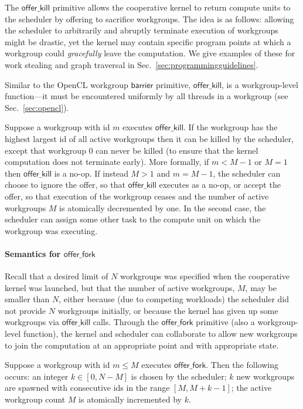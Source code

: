 \documentclass[numbers,nocopyrightspace,10pt]{sigplanconf}
\newcommand{\mysec}{Sec.~}
\newcommand{\offerfork}{\mathsf{offer\_fork}}
\newcommand{\offerkill}{\mathsf{offer\_kill}}
\begin{document}
The $\offerkill$ primitive allows the cooperative kernel to return
compute units to the scheduler by offering to sacrifice workgroups.
The idea is as follows: allowing the scheduler to arbitrarily and abruptly terminate execution
of workgroups might be drastic, yet the kernel
may contain specific program points at which a workgroup could
\emph{gracefully} leave the computation.  We give examples of these
for work stealing and graph traversal in \mysec\ref{sec:programmingguidelines}.

Similar to the OpenCL workgroup $\mathsf{barrier}$ primitive,
$\offerkill$, is a workgroup-level function---it must be encountered
uniformly by all threads in a workgroup (see
\mysec\ref{sec:opencl}).

Suppose a workgroup with id $m$ executes $\offerkill$.  
If the workgroup has the highest largest id of all active workgroups then it can be killed by the scheduler, except that workgroup 0 can never be killed (to ensure that the kernel computation does not terminate early).  More formally, if $m < M-1$
or $M=1$ then $\offerkill$ is a no-op.  If instead $M > 1$ and $m =
M-1$, the scheduler can choose to ignore the offer, so that $\offerkill$
executes as a no-op, or accept the offer, so that execution of the workgroup ceases and
the number of active workgroups $M$ is atomically decremented by one.  In the second case, the scheduler can assign some other task to
the compute unit on which the workgroup was executing.


\paragraph{Semantics for $\offerfork$}

Recall that
a desired limit of $N$ workgroups was specified when the cooperative kernel was launched, but that the number of active workgroups, $M$, may be smaller
than $N$, either because (due to competing workloads) the scheduler
did not provide $N$ workgroups initially, or because the kernel has
given up some workgroups via $\offerkill$ calls.  Through the
$\offerfork$ primitive (also a workgroup-level function), the kernel and scheduler can collaborate to allow new
workgroups to join the computation at an appropriate point and with
appropriate state.

Suppose a workgroup with id $m\leq M$ executes $\offerfork$.  Then the following occurs: an
integer $k \in [0, N-M]$ is chosen by the scheduler;
$k$ new workgroups are spawned with consecutive ids in the range $[M,
  M+k-1]$; the active workgroup count $M$ is atomically incremented by $k$.
\end{document}
